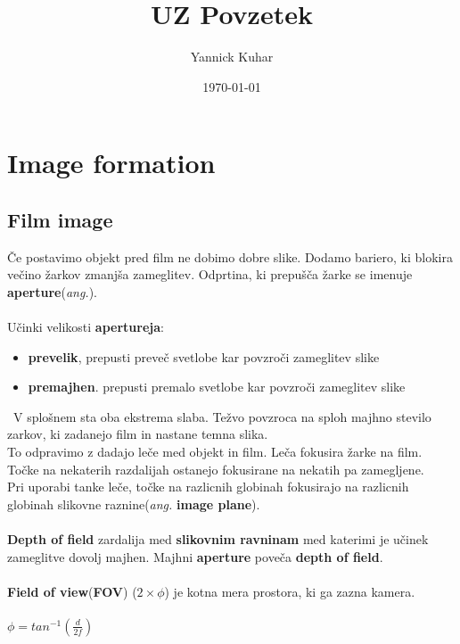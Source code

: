 \documentclass[11pt]{article}
\title{UZ Povzetek}
\author{Yannick Kuhar}
\date{\today}
\begin{document}
\clearpage
\maketitle
\thispagestyle{empty}

\newpage

\section{Image formation}

\subsection{Film image}

\v{C}e postavimo objekt pred film ne dobimo dobre slike. Dodamo bariero, ki blokira ve\v{c}ino \v{z}arkov zmanj\v{s}a zameglitev. Odprtina, ki prepu\v{s}\v{c}a \v{z}arke se imenuje \textbf{aperture}(\textit{ang.}). \\
\\
U\v{c}inki velikosti \textbf{apertureja}:
\begin{itemize}
\item \textbf{prevelik}, prepusti preve\v{c} svetlobe kar povzro\v{c}i zameglitev slike
\item \textbf{premajhen}. prepusti premalo svetlobe kar povzro\v{c}i zameglitev slike
\end{itemize}
\
V splo\v{s}nem sta oba ekstrema slaba. Te\v{z}vo povzroca na sploh majhno stevilo zarkov, ki zadanejo film in nastane temna slika. \\
To odpravimo z dadajo le\v{c}e med objekt in film. Le\v{c}a fokusira \v{z}arke na film. To\v{c}ke na nekaterih razdalijah ostanejo fokusirane na nekatih pa zamegljene. \\
Pri uporabi tanke le\v{c}e, to\v{c}ke na razlicnih globinah fokusirajo na razlicnih globinah slikovne raznine(\textit{ang.} \textbf{image plane}). \\
\\
\textbf{Depth of field} zardalija med \textbf{slikovnim ravninam} med katerimi je u\v{c}inek zameglitve dovolj majhen. Majhni \textbf{aperture} pove\v{c}a \textbf{depth of field}. \\
\\
\textbf{Field of view}(\textbf{FOV}) ($2 \times \phi$) je kotna mera prostora, ki ga zazna kamera. \\
\\
$\phi = tan^{-1}(\frac{d}{2f})$\\
\\
\end{document}
